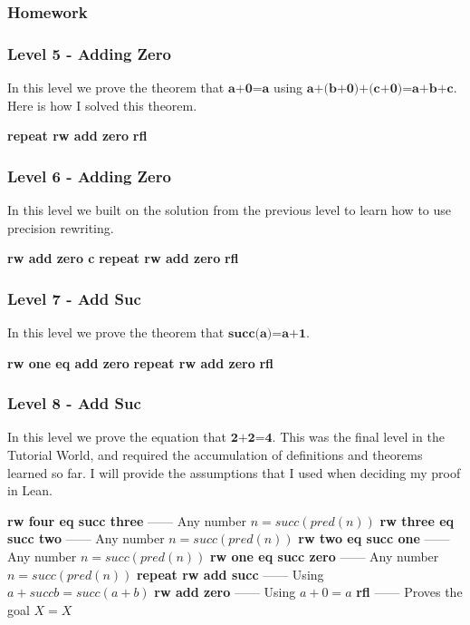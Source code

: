 \documentclass{article}
\theoremstyle{theorem}
\theoremstyle{definition}
\theoremstyle{remark}
\begin{document}
\subsubsection*{Homework}

  \subsubsection*{Level 5 - Adding Zero}
  In this level we prove the theorem that $\textbf{a+0=a}$ using $\textbf{a+(b+0)+(c+0)=a+b+c}$. Here is how I solved this theorem.

  \bgroup\obeylines
  \qquad \textbf{repeat rw add zero}
  \qquad \textbf{rfl}
  \egroup

  \subsubsection*{Level 6 - Adding Zero}
  In this level we built on the solution from the previous level to learn how to use precision rewriting.

  \bgroup\obeylines
  \qquad \textbf{rw add zero c}
  \qquad \textbf{repeat rw add zero}
  \qquad \textbf{rfl}
  \egroup

  \subsubsection*{Level 7 - Add Suc}
  In this level we prove the theorem that $\textbf{succ(a)=a+1}$.

  \bgroup\obeylines
  \qquad \textbf{rw one eq add zero}
  \qquad \textbf{repeat rw add zero}
  \qquad \textbf{rfl}
  \egroup

  \subsubsection*{Level 8 - Add Suc}
  In this level we prove the equation that $\textbf{2+2=4}$. This was the final level in the Tutorial World, and required the accumulation of definitions and theorems learned so far. I will provide the assumptions that I used when deciding my proof in Lean.

  \bgroup\obeylines
  \qquad \textbf{rw four eq succ three} —— Any number $n = succ(pred(n))$
  \qquad \textbf{rw three eq succ two}  —— Any number $n = succ(pred(n))$
  \qquad \textbf{rw two eq succ one}    —— Any number $n = succ(pred(n))$
  \qquad \textbf{rw one eq succ zero}   —— Any number $n = succ(pred(n))$
  \qquad \textbf{repeat rw add succ}    —— Using $a + succ b = succ (a + b)$
  \qquad \textbf{rw add zero}           —— Using $a + 0 = a$
  \qquad \textbf{rfl}                   —— Proves the goal $X = X$
\end{document}
